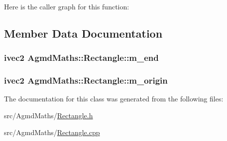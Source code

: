 Here is the caller graph for this function\+:




\subsection{Member Data Documentation}
\hypertarget{class_agmd_maths_1_1_rectangle_a5cc9ed9b61fdcfe68c2eb6d4df9a25a3}{
\subsubsection[{m\+\_\+end}]{\setlength{\rightskip}{0pt plus 5cm}ivec2 Agmd\+Maths\+::\+Rectangle\+::m\+\_\+end}}\label{class_agmd_maths_1_1_rectangle_a5cc9ed9b61fdcfe68c2eb6d4df9a25a3}
\hypertarget{class_agmd_maths_1_1_rectangle_a080e6e9953184ed15b67650a88547e08}{
\subsubsection[{m\+\_\+origin}]{\setlength{\rightskip}{0pt plus 5cm}ivec2 Agmd\+Maths\+::\+Rectangle\+::m\+\_\+origin}}\label{class_agmd_maths_1_1_rectangle_a080e6e9953184ed15b67650a88547e08}


The documentation for this class was generated from the following files\+:\begin{DoxyCompactItemize}
\item 
src/\+Agmd\+Maths/\hyperlink{_agmd_maths_2_rectangle_8h}{Rectangle.\+h}\item 
src/\+Agmd\+Maths/\hyperlink{_agmd_maths_2_rectangle_8cpp}{Rectangle.\+cpp}\end{DoxyCompactItemize}
